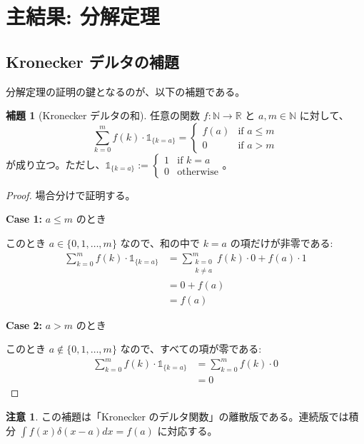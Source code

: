 \documentclass[a4paper,12pt]{ltjsarticle}
\theoremstyle{definition}
\newtheorem{lemma}[theorem]{補題}
\newtheorem{remark}[theorem]{注意}
\begin{document}
\section{主結果: 分解定理}

\subsection{Kronecker デルタの補題}

分解定理の証明の鍵となるのが、以下の補題である。

\begin{lemma}[Kronecker デルタの和]
\label{lem:kronecker_sum}
任意の関数 $f : \mathbb{N} \to \mathbb{R}$ と $a, m \in \mathbb{N}$ に対して、
\[
\sum_{k=0}^{m} f(k) \cdot \mathbb{1}_{\{k = a\}} =
\begin{cases}
f(a) & \text{if } a \leq m \\
0 & \text{if } a > m
\end{cases}
\]
が成り立つ。ただし、$\mathbb{1}_{\{k = a\}} := \begin{cases} 1 & \text{if } k = a \\ 0 & \text{otherwise} \end{cases}$。
\end{lemma}

\begin{proof}
場合分けで証明する。

\textbf{Case 1:} $a \leq m$ のとき

このとき $a \in \{0, 1, \ldots, m\}$ なので、和の中で $k = a$ の項だけが非零である:
\begin{align*}
\sum_{k=0}^{m} f(k) \cdot \mathbb{1}_{\{k = a\}}
&= \sum_{\substack{k=0\\k \neq a}}^{m} f(k) \cdot 0 + f(a) \cdot 1 \\
&= 0 + f(a) \\
&= f(a)
\end{align*}

\textbf{Case 2:} $a > m$ のとき

このとき $a \notin \{0, 1, \ldots, m\}$ なので、すべての項が零である:
\begin{align*}
\sum_{k=0}^{m} f(k) \cdot \mathbb{1}_{\{k = a\}}
&= \sum_{k=0}^{m} f(k) \cdot 0 \\
&= 0
\end{align*}
\end{proof}

\begin{remark}
この補題は「Kronecker のデルタ関数」の離散版である。連続版では積分 $\int f(x) \delta(x - a) dx = f(a)$ に対応する。
\end{remark}
\end{document}
